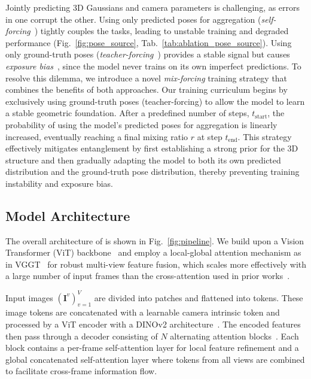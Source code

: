 Jointly predicting 3D Gaussians and camera parameters is challenging, as errors in one corrupt the other. Using only predicted poses for aggregation (\textit{self-forcing}~\cite{self-forcing}) tightly couples the tasks, leading to unstable training and degraded performance (Fig.~\ref{fig:pose_source}, Tab.~\ref{tab:ablation_pose_source}). Using only ground-truth poses (\textit{teacher-forcing}~\citep{teacher-forcing}) provides a stable signal but causes \textit{exposure bias}~\cite{exposure-bias}, since the model never trains on its own imperfect predictions.  
To resolve this dilemma, we introduce a novel \textit{mix-forcing} training strategy that combines the benefits of both approaches. Our training curriculum begins by exclusively using ground-truth poses (teacher-forcing) to allow the model to learn a stable geometric foundation. After a predefined number of steps, $t_{\text{start}}$, the probability of using the model's predicted poses for aggregation is linearly increased, eventually reaching a final mixing ratio $r$ at step $t_{\text{end}}$. This strategy effectively mitigates entanglement by first establishing a strong prior for the 3D structure and then gradually adapting the model to both its own predicted distribution and the ground-truth pose distribution, thereby preventing training instability and exposure bias.



\vspace{-1mm}
\subsection{Model Architecture}\label{sec:network}
\vspace{-2mm}
The overall architecture of \ourmethod{} is shown in Fig.~\ref{fig:pipeline}. We build upon a Vision Transformer (ViT) backbone~\citep{vit} and employ a local-global attention mechanism as in VGGT~\citep{vggt} for robust multi-view feature fusion, which scales more effectively with a large number of input frames than the cross-attention used in prior works~\citep{noposplat}.

Input images $(\boldsymbol{I}^v)_{v=1}^V$ are divided into patches and flattened into tokens. These image tokens are concatenated with a learnable camera intrinsic token and processed by a ViT encoder with a DINOv2 architecture~\citep{dinov2}. The encoded features then pass through a decoder consisting of $N$ alternating attention blocks~\citep{vggt, pi3}. Each block contains a per-frame self-attention layer for local feature refinement and a global concatenated self-attention layer where tokens from all views are combined to facilitate cross-frame information flow.

